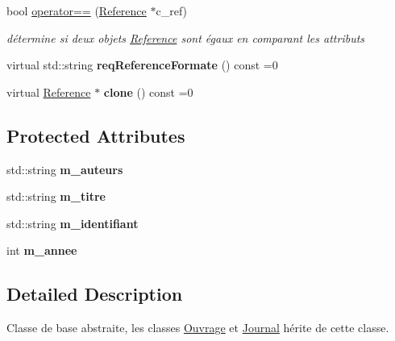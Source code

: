 \begin{DoxyCompactItemize}
bool \hyperlink{classbiblio_1_1Reference_a37fde155612f4a9cc58fa3d6a125e024}{operator==} (\hyperlink{classbiblio_1_1Reference}{Reference} $\ast$c\+\_\+ref)
\begin{DoxyCompactList}\small\item\em détermine si deux objets \hyperlink{classbiblio_1_1Reference}{Reference} sont égaux en comparant les attributs \end{DoxyCompactList}\item 
\mbox{\label{classbiblio_1_1Reference_a901a53cc5f23012fc02b2bbc17d6d7aa}} 
virtual std\+::string {\bfseries req\+Reference\+Formate} () const =0
\item 
\mbox{\label{classbiblio_1_1Reference_a912da874b8a5221d8e17aa3118d3116b}} 
virtual \hyperlink{classbiblio_1_1Reference}{Reference} $\ast$ {\bfseries clone} () const =0
\end{DoxyCompactItemize}
\subsection*{Protected Attributes}
\begin{DoxyCompactItemize}
\item 
\mbox{\label{classbiblio_1_1Reference_ab7bfeb4a416f7d1b3d7929c79a44c9c6}} 
std\+::string {\bfseries m\+\_\+auteurs}
\item 
\mbox{\label{classbiblio_1_1Reference_a340a7d5fd78d419e6f48db3120299ce7}} 
std\+::string {\bfseries m\+\_\+titre}
\item 
\mbox{\label{classbiblio_1_1Reference_a15374f0ddba5060ed50d7ef557643109}} 
std\+::string {\bfseries m\+\_\+identifiant}
\item 
\mbox{\label{classbiblio_1_1Reference_a5ac4da2899bd6275d2c5632daea05433}} 
int {\bfseries m\+\_\+annee}
\end{DoxyCompactItemize}


\subsection{Detailed Description}
Classe de base abstraite, les classes \hyperlink{classbiblio_1_1Ouvrage}{Ouvrage} et \hyperlink{classbiblio_1_1Journal}{Journal} hérite de cette classe. 

